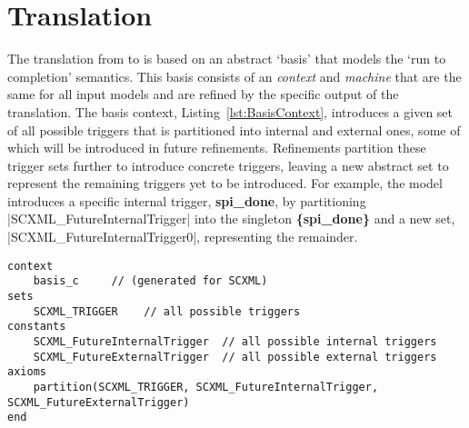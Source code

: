 
\section{\SCXML Translation}
\label{sec:translation}

The translation from \iUMLB to \EventB is based on an abstract `basis' that models the `run to completion' semantics. 
This basis consists of an \EventB \emph{context} and \emph{machine} that are the same for all input models and are refined by the specific output of the translation.  
The basis context, Listing~\ref{lst:BasisContext}, introduces a given set of all possible triggers that is partitioned into internal and external ones, some of which will be introduced in future refinements. 
Refinements partition these trigger sets further to introduce concrete triggers, leaving a new abstract set to represent the remaining triggers yet to be introduced. 
For example, the \IDS model introduces a specific internal trigger, \textbf{spi\_done},  by partitioning |SCXML_FutureInternalTrigger| into the singleton \textbf{\{spi\_done\}} and a new set, |SCXML_FutureInternalTrigger0|, representing the remainder. 

\begin{lstlisting}[caption={Abstract basis context},label={lst:BasisContext}, language=Event-B, escapechar=|, frame=single, basicstyle=\rmfamily\scriptsize]
context
	basis_c 	// (generated for SCXML)
sets
	SCXML_TRIGGER	 // all possible triggers
constants
	SCXML_FutureInternalTrigger	 // all possible internal triggers
	SCXML_FutureExternalTrigger	 // all possible external triggers  
axioms
	partition(SCXML_TRIGGER, SCXML_FutureInternalTrigger, SCXML_FutureExternalTrigger) 
end
\end{lstlisting}	


